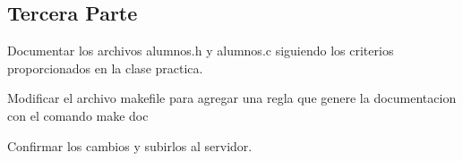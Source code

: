 \subsection*{Tercera Parte}


\begin{DoxyEnumerate}
\item Documentar los archivos {\ttfamily alumnos.\+h} y {\ttfamily alumnos.\+c} siguiendo los criterios proporcionados en la clase practica.
\item Modificar el archivo {\ttfamily makefile} para agregar una regla que genere la documentacion con el comando {\ttfamily make doc}
\item Confirmar los cambios y subirlos al servidor. 
\end{DoxyEnumerate}